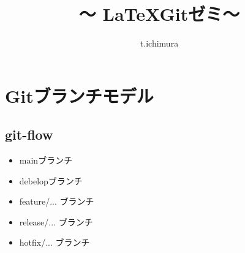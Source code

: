 \documentclass[uplatex, dvipdfmx, a4paper]{jsarticle}
\begin{document}
\title{～ \LaTeX Gitゼミ～}
\author{t.ichimura}
\maketitle{}


\section{Gitブランチモデル}
\label{sec: Cross reference}

\subsection{git-flow}
\label{ssc: About Label}

\begin{itemize}
  \item mainブランチ
  \item debelopブランチ
  \item feature/... ブランチ
  \item release/... ブランチ
  \item hotfix/... ブランチ
\end{itemize}
\end{document}
